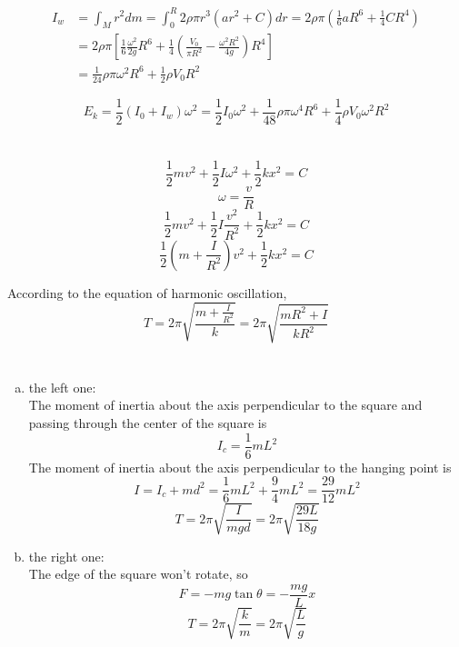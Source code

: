 \documentclass{article}
\begin{document}
\begin{align*}
	I_w&=\int_M r^2dm=\int_0^R2\rho\pi r^3(ar^2+C)dr=2\rho\pi\left(\frac{1}{6}aR^6+\frac{1}{4}CR^4\right)\\
	&=2\rho\pi\left[\frac{1}{6}\frac{\omega^2}{2g}R^6+\frac{1}{4}\left(\frac{V_0}{\pi R^2}-\frac{\omega^2R^2}{4g}\right)R^4\right]\\
	&=\frac{1}{24}\rho\pi\omega^2R^6+\frac{1}{2}\rho V_0R^2
\end{align*}

$$E_k=\frac{1}{2}(I_0+I_w)\omega^2=\frac{1}{2}I_0\omega^2+\frac{1}{48}\rho\pi\omega^4R^6+\frac{1}{4}\rho V_0\omega^2R^2$$

\section{}
$$\frac{1}{2}mv^2+\frac{1}{2}I\omega^2+\frac{1}{2}kx^2=C$$
$$\omega=\frac{v}{R}$$
$$\frac{1}{2}mv^2+\frac{1}{2}I\frac{v^2}{R^2}+\frac{1}{2}kx^2=C$$
$$\frac{1}{2}\left(m+\frac{I}{R^2}\right)v^2+\frac{1}{2}kx^2=C$$

According to the equation of harmonic oscillation,
$$T=2\pi\sqrt{\frac{m+\frac{I}{R^2}}{k}}=2\pi\sqrt{\frac{mR^2+I}{kR^2}}$$

\section{}
\begin{enumerate}[(a)]
\item the left one:\\
The moment of inertia about the axis perpendicular to the square and passing through the center of the square is
$$I_c=\frac{1}{6}mL^2$$
The moment of inertia about the axis perpendicular to the hanging point is
$$I=I_c+md^2=\frac{1}{6}mL^2+\frac{9}{4}mL^2=\frac{29}{12}mL^2$$
$$T=2\pi\sqrt{\frac{I}{mgd}}=2\pi\sqrt{\frac{29L}{18g}}$$

\item the right one:\\
The edge of the square won't rotate, so
$$F=-mg\tan\theta=-\frac{mg}{L}x$$
$$T=2\pi\sqrt{\frac{k}{m}}=2\pi\sqrt{\frac{L}{g}}$$

\end{enumerate}
\end{document}
